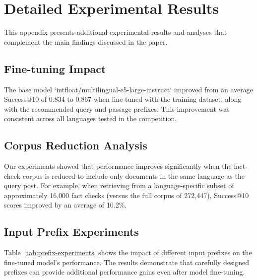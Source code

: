\documentclass[11pt]{article}
\begin{document}
\appendix

\section{Detailed Experimental Results}
\label{sec:appendix-results}

This appendix presents additional experimental results and analyses that complement the main findings discussed in the paper.

\subsection{Fine-tuning Impact}

The base model `intfloat/multilingual-e5-large-instruct` \cite{wang2024multilingual} improved from an average Success@10 of 0.834 to 0.867 when fine-tuned with the training dataset, along with the recommended query and passage prefixes. This improvement was consistent across all languages tested in the competition.

\subsection{Corpus Reduction Analysis}

Our experiments showed that performance improves significantly when the fact-check corpus is reduced to include only documents in the same language as the query post. For example, when retrieving from a language-specific subset of approximately 16,000 fact checks (versus the full corpus of 272,447), Success@10 scores improved by an average of 10.2\%.

\subsection{Input Prefix Experiments}

Table~\ref{tab:prefix-experiments} shows the impact of different input prefixes on the fine-tuned model's performance. The results demonstrate that carefully designed prefixes can provide additional performance gains even after model fine-tuning.
\end{document}
